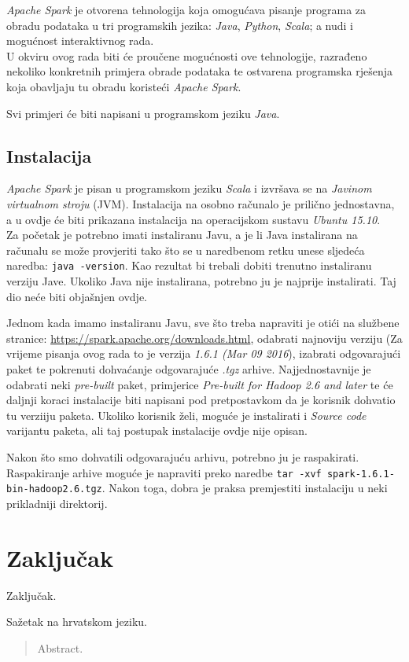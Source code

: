 \documentclass[times, utf8, zavrsni]{fer}
\begin{document}
\emph{Apache Spark} je otvorena  tehnologija koja omogućava pisanje programa za obradu podataka u tri programskih jezika: \emph{Java}, \emph{Python}, \emph{Scala}; a nudi i mogućnost interaktivnog rada. \\
U okviru ovog rada biti će proučene mogućnosti ove tehnologije, razrađeno nekoliko konkretnih primjera obrade podataka te ostvarena programska rješenja koja obavljaju tu obradu koristeći \emph{Apache Spark}.

Svi primjeri će biti napisani u programskom jeziku \emph{Java}.

\section{Instalacija}
\emph{Apache Spark} je pisan u programskom jeziku \emph{Scala} i izvršava se na \emph{Javinom virtualnom stroju}  (JVM). Instalacija na osobno računalo je prilično jednostavna, a u ovdje će biti prikazana instalacija na operacijskom sustavu \emph{Ubuntu 15.10}. \\
Za početak je potrebno imati instaliranu Javu, a je li Java instalirana na računalu se može provjeriti tako što se u naredbenom retku unese sljedeća naredba: \texttt{java -version}. Kao rezultat bi trebali dobiti trenutno instaliranu verziju Jave. Ukoliko Java nije instalirana, potrebno ju je najprije instalirati. Taj dio neće biti objašnjen ovdje.

Jednom kada imamo instaliranu Javu, sve što treba napraviti je otići na službene stranice: \url{https://spark.apache.org/downloads.html}, odabrati najnoviju verziju (Za vrijeme pisanja ovog rada to je verzija \emph{1.6.1 (Mar 09 2016}), izabrati odgovarajući paket te pokrenuti dohvaćanje odgovarajuće \emph{.tgz} arhive. Najjednostavnije je odabrati neki \emph{pre-built} paket, primjerice \emph{Pre-built for Hadoop 2.6 and later} te će daljnji koraci instalacije biti napisani pod pretpostavkom da je korisnik dohvatio tu verziiju paketa. Ukoliko korisnik želi, moguće je instalirati i \emph{Source code} varijantu paketa, ali taj postupak instalacije ovdje nije opisan. 

Nakon što smo dohvatili odgovarajuću arhivu, potrebno ju je raspakirati. Raspakiranje arhive moguće je napraviti preko naredbe \texttt{tar -xvf spark-1.6.1-bin-hadoop2.6.tgz}. Nakon toga, dobra je praksa premjestiti instalaciju u neki prikladniji direktorij.

\chapter{Zaključak}
Zaključak.




\begin{sazetak}
Sažetak na hrvatskom jeziku.

\end{sazetak}

\begin{abstract}
Abstract.

\end{abstract}
\end{document}
